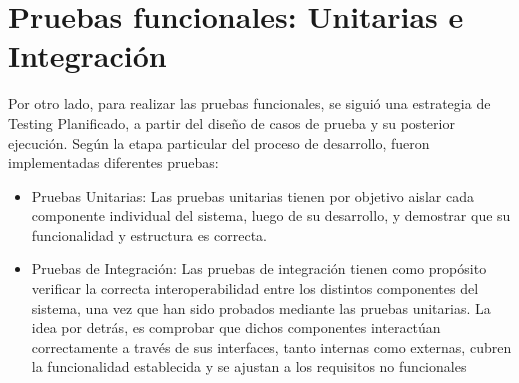 \section{Pruebas funcionales: Unitarias e Integración}

Por otro lado, para realizar las pruebas funcionales, se siguió una estrategia de Testing Planificado, a partir del diseño de casos de prueba y su posterior ejecución. Según la etapa particular del proceso de desarrollo, fueron implementadas diferentes pruebas:

\begin{itemize}
    \item Pruebas Unitarias: Las pruebas unitarias tienen por objetivo aislar cada componente individual del sistema, luego de su desarrollo, y demostrar que su funcionalidad y estructura es correcta.
    \item Pruebas de Integración: Las pruebas de integración tienen como propósito verificar la correcta interoperabilidad entre los distintos componentes del sistema, una vez que han sido probados mediante las pruebas unitarias. La idea por detrás, es comprobar que dichos componentes interactúan correctamente a través de sus interfaces, tanto internas como externas, cubren la funcionalidad establecida y se ajustan a los requisitos no funcionales
\end{itemize}

